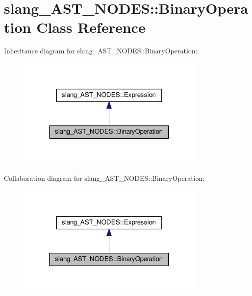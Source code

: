 \hypertarget{classslang__AST__NODES_1_1BinaryOperation}{}\section{slang\+\_\+\+A\+S\+T\+\_\+\+N\+O\+D\+ES\+:\+:Binary\+Operation Class Reference}
\label{classslang__AST__NODES_1_1BinaryOperation}


Inheritance diagram for slang\+\_\+\+A\+S\+T\+\_\+\+N\+O\+D\+ES\+:\+:Binary\+Operation\+:
\nopagebreak
\begin{figure}[H]
\begin{center}
\leavevmode
\includegraphics[width=262pt]{classslang__AST__NODES_1_1BinaryOperation__inherit__graph}
\end{center}
\end{figure}


Collaboration diagram for slang\+\_\+\+A\+S\+T\+\_\+\+N\+O\+D\+ES\+:\+:Binary\+Operation\+:
\nopagebreak
\begin{figure}[H]
\begin{center}
\leavevmode
\includegraphics[width=262pt]{classslang__AST__NODES_1_1BinaryOperation__coll__graph}
\end{center}
\end{figure}
